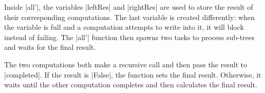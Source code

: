 \documentclass{sigplanconf}
\begin{document}
Inside |all'|, the variables |leftRes| and |rightRes| are used to store the 
result of their corresponding computations. The last variable is created differently: when
the variable is full and a computation attempts to write into it, it will block instead of
failing. The |all'| function then spawns two tasks to process sub-trees and waits for 
the final result.

The two computations both make a recursive call and then pass the result to |completed|. If the 
result is |False|, the function sets the final result. Otherwise, it waits until the other 
computation completes and then calculates the final result.


\end{document}
